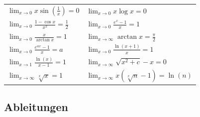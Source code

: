 \documentclass[a4paper,10pt]{article}
\def\limxo{\lim_{x\to 0}}
\def\limxi{\lim_{x\to\infty}}
\begin{document}
\begin{center}
\begin{tabularx}{\linewidth}{XX}
		$\limxo x \sin(\frac{1}{x}) = 0$                           & $\limxo x \log x = 0$                    \\
		$\limxo \frac{1 - \cos x}{x^2} = \frac{1}{2}$              & $\limxo \frac{e^x-1}{x} = 1$             \\
		$\limxo \frac{x}{\arctan x} = 1$                           & $\limxi \arctan x = \frac{\pi}{2}$       \\
		$\limxo \frac{e^{ax}-1}{x} = a$                            & $\limxo \frac{\ln(x+1)}{x} = 1$          \\
		$\lim_{x\to 1} \frac{\ln(x)}{x-1} = 1$                     & $\limxi \sqrt{x^2 + c} - x = 0$          \\
		$\limxi \sqrt[x]{x} = 1$                                   & $\limxi x(\sqrt[x]{n} - 1) = \ln(n)$     \\
		\bottomrule
	\end{tabularx}
\end{center}

\subsection{Ableitungen}
\end{document}

